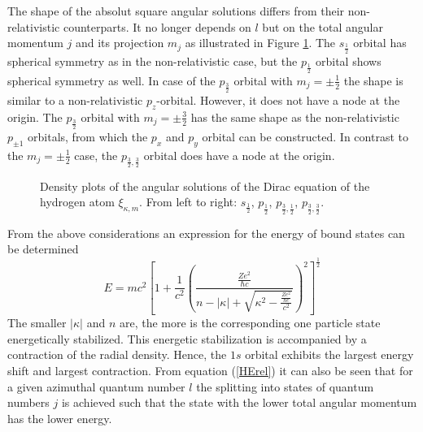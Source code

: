 The shape of the absolut square angular solutions differs from their
non-relativistic counterparts. It no longer depends on $l$ but on the total
angular momentum $j$ and its projection $m_j$ as illustrated in Figure
\ref{figure:ang_orb}. The $s_{\frac12}$ orbital has spherical symmetry as
in the non-relativistic case, but the $p_{\frac12}$ orbital shows spherical
symmetry as well. In case of the $p_{\frac32}$ orbital with $m_j=\pm \frac12$
the shape is similar to a non-relativistic $p_z$-orbital. However, it does not
have a node at the origin. The $p_{\frac32}$ orbital with $m_j=\pm \frac32$
has the same shape as the non-relativistic $p_{\pm 1}$ orbitals, from which
the $p_x$ and $p_y$ orbital can be constructed. In contrast to the
$m_j=\pm \frac12$ case, the $p_{\frac32,\frac32}$ orbital does have a node at
the origin.

\begin{figure}
\centering
     \hfill
     \hfill
   \hfill
  \raisebox{1cm}{}
\caption{Density plots of the angular solutions of the Dirac equation
         of the hydrogen atom $\xi_{\kappa,m}$. From left to right:
         $s_{\frac12}$, $p_{\frac12}$, $p_{\frac32,\frac12}$,
         $p_{\frac32,\frac32}$.}
\label{figure:ang_orb}
\end{figure}


From the above considerations an expression for the energy of bound states can be
determined
\begin{equation}\label{HErel}
E = mc^2 \left[1+ \frac1{c^2}
    \left(\frac{\frac{Ze^2}{\hbar c}}{n-|\kappa|+
         \sqrt{\kappa^2-\frac{\frac{Ze^2}{\hbar c}}{c^2}}}\right)^2
    \right]^{\frac12}
\end{equation}
The smaller $|\kappa|$ and $n$ are, the more is the corresponding one particle
state energetically stabilized. This energetic stabilization is accompanied
by a contraction of the radial density. Hence, the $1s$ orbital exhibits the
largest energy shift and largest contraction. From equation
(\ref{HErel}) it can also be seen
that for a given azimuthal quantum number $l$ the splitting into states of quantum
numbers $j$ is achieved such that the state with the lower total angular momentum
has the lower energy.


